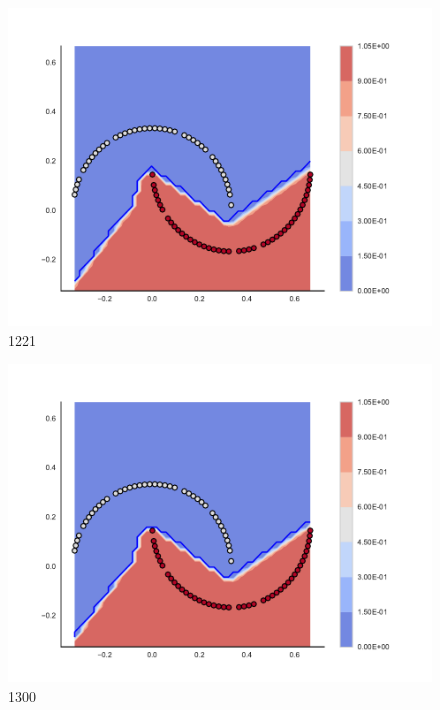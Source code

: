 \begin{subfigure}[b]{0.09\textwidth}
    \includegraphics[clip, trim=2.35cm 1.75cm 4.5cm 0cm,width=\textwidth]{img/convergence/1221.pdf}
    \caption{1221}
    \label{fig:convergence_1221}
\end{subfigure}
%
\begin{subfigure}[b]{0.09\textwidth}
    \includegraphics[clip, trim=2.35cm 1.75cm 4.5cm 0cm,width=\textwidth]{img/convergence/1300.pdf}
    \caption{1300}
    \label{fig:convergence_1300}
\end{subfigure}
%
